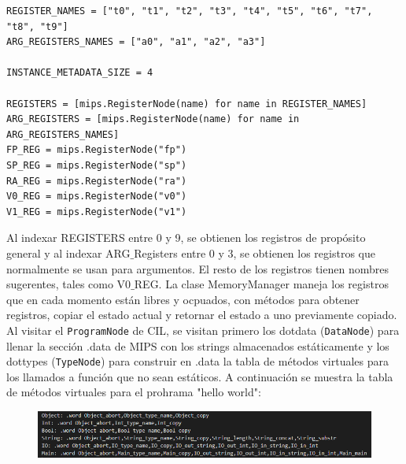 \documentclass[a4paper,12pt]{article}
\def\code#1{\texttt{#1}}
\begin{document}
\begin{lstlisting}
REGISTER_NAMES = ["t0", "t1", "t2", "t3", "t4", "t5", "t6", "t7", "t8", "t9"]
ARG_REGISTERS_NAMES = ["a0", "a1", "a2", "a3"]

INSTANCE_METADATA_SIZE = 4

REGISTERS = [mips.RegisterNode(name) for name in REGISTER_NAMES]
ARG_REGISTERS = [mips.RegisterNode(name) for name in ARG_REGISTERS_NAMES]
FP_REG = mips.RegisterNode("fp")
SP_REG = mips.RegisterNode("sp")
RA_REG = mips.RegisterNode("ra")
V0_REG = mips.RegisterNode("v0")
V1_REG = mips.RegisterNode("v1")
\end{lstlisting}

Al indexar REGISTERS entre 0 y 9, se obtienen los registros de propósito general y al indexar ARG$\_$Registers entre 0 y 3, se obtienen los registros que normalmente se usan para argumentos. El resto de los registros tienen nombres sugerentes, tales como V0$\_$REG. La clase MemoryManager maneja los registros que en cada momento están libres y ocpuados, con métodos para obtener registros, copiar el estado actual y retornar el estado a uno previamente copiado.\\
Al visitar el \code{ProgramNode} de CIL, se visitan primero los dotdata (\code{DataNode}) para llenar la sección .data de MIPS con los strings almacenados estáticamente y los dottypes (\code{TypeNode}) para construir en .data la tabla de métodos virtuales para los llamados a función que no sean estáticos. A continuación se muestra la tabla de métodos virtuales para el prohrama "hello world":

\begin{figure}[H]
\centering
\includegraphics[width=0.9\linewidth]{./5}
\caption{}
\label{fig:5}
\end{figure}
\end{document}
